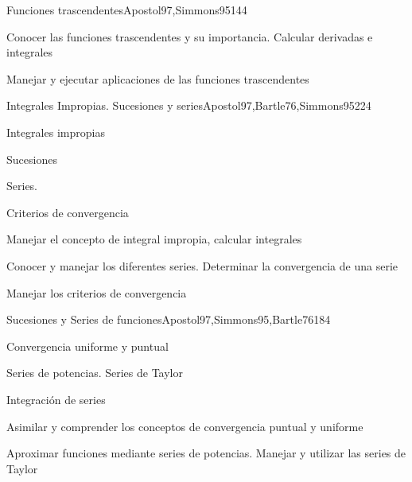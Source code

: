 \begin{syllabus}
\begin{unit}{Funciones trascendentes}{}{Apostol97,Simmons95}{14}{4}
   \begin{learningoutcomes}
      \item Conocer las funciones trascendentes y su importancia. Calcular derivadas e integrales
      \item Manejar y ejecutar aplicaciones de las funciones trascendentes
      \end{learningoutcomes}
\end{unit}

\begin{unit}{Integrales Impropias. Sucesiones y series}{}{Apostol97,Bartle76,Simmons95}{22}{4}
   \begin{topics}
      \item Integrales impropias
      \item Sucesiones
      \item Series.
      \item Criterios de convergencia
   \end{topics}

   \begin{learningoutcomes}
      \item Manejar el concepto de integral impropia, calcular integrales
      \item Conocer y manejar los diferentes series. Determinar la convergencia de una serie
      \item Manejar los criterios de convergencia
      \end{learningoutcomes}
\end{unit}

\begin{unit}{Sucesiones y Series de funciones}{}{Apostol97,Simmons95,Bartle76}{18}{4}
   \begin{topics}
      \item Convergencia uniforme y puntual
      \item Series de potencias. Series de Taylor
      \item Integración de series
   \end{topics}

   \begin{learningoutcomes}
      \item Asimilar y comprender los conceptos de convergencia puntual y uniforme
      \item Aproximar funciones mediante series de potencias. Manejar y utilizar las series de Taylor
      \end{learningoutcomes}
\end{unit}


\end{syllabus}

